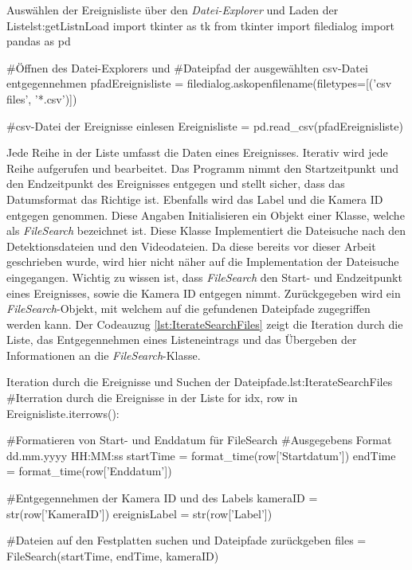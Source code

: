 \begin{pythoncode}{Auswählen der Ereignisliste über den \textit{Datei-Explorer} und Laden der Liste}{lst:getListnLoad}
import tkinter as tk
from tkinter import filedialog
import pandas as pd

#Öffnen des Datei-Explorers und 
#Dateipfad der ausgewählten csv-Datei entgegennehmen 
pfadEreignisliste = filedialog.askopenfilename(filetypes=[('csv files', '*.csv')])   

#csv-Datei der Ereignisse einlesen  
Ereignisliste = pd.read_csv(pfadEreignisliste)
\end{pythoncode}

Jede Reihe in der Liste umfasst die Daten eines Ereignisses. Iterativ wird jede Reihe aufgerufen und bearbeitet. Das Programm nimmt den Startzeitpunkt und den Endzeitpunkt des Ereignisses entgegen und stellt sicher, dass das Datumsformat das Richtige ist. Ebenfalls wird das Label und die Kamera ID entgegen genommen. Diese Angaben Initialisieren ein Objekt einer Klasse, welche als \textit{FileSearch} bezeichnet ist. Diese Klasse Implementiert die Dateisuche nach den Detektionsdateien und den Videodateien. Da diese bereits vor dieser Arbeit geschrieben wurde, wird hier nicht näher auf die Implementation der Dateisuche eingegangen. Wichtig zu wissen ist, dass \textit{FileSearch} den Start- und Endzeitpunkt eines Ereignisses, sowie die Kamera ID entgegen nimmt. Zurückgegeben wird ein \textit{FileSearch}-Objekt, mit welchem auf die gefundenen Dateipfade zugegriffen werden kann. Der Codeauzug \ref{lst:IterateSearchFiles} zeigt die Iteration durch die Liste, das Entgegennehmen eines Listeneintrags und das Übergeben der Informationen an die \textit{FileSearch}-Klasse.

\begin{pythoncode}{Iteration durch die Ereignisse und Suchen der Dateipfade.}{lst:IterateSearchFiles}
#Iterration durch die Ereignisse in der Liste
for idx, row in Ereignisliste.iterrows():  
    
    #Formatieren von  Start- und Enddatum für FileSearch
    #Ausgegebens Format dd.mm.yyyy HH:MM:ss
    startTime = format_time(row['Startdatum'])
    endTime = format_time(row['Enddatum'])

    #Entgegennehmen der Kamera ID und des Labels
    kameraID = str(row['KameraID'])
    ereignisLabel = str(row['Label'])

    #Dateien auf den Festplatten suchen und Dateipfade zurückgeben 
    files = FileSearch(startTime, endTime, kameraID)
\end{pythoncode}


